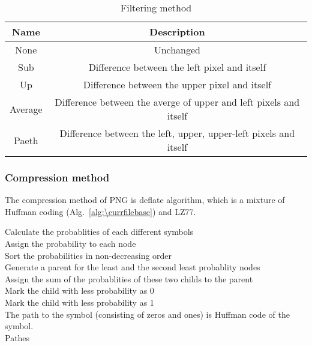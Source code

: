 \documentclass[catalog.tex]{subfiles}
\begin{document}
	\begin{table}[!htb]
		\caption{Filtering method}
		\label{tbl:\currfilebase_4}
		\centering
		\begin{tabular}{cc}
			\toprule
			Name & Description \\
			\midrule
			None & Unchanged \\
			\midrule
			Sub & Difference between the left pixel and itself \\
			\midrule
			Up & Difference between the upper pixel and itself \\
			\midrule
			Average & Difference between the averge of upper and left pixels and itself \\
			\midrule
			Paeth & Difference between the left, upper, upper-left pixels and itself\\
			\bottomrule
		\end{tabular}
	\end{table}

	\newpage
	\subsubsection*{Compression method}
	The compression method of PNG is deflate algorithm, which is a mixture of Huffman coding (Alg.~\ref{alg:\currfilebase}) and LZ77.
	\begin{Algorithm}[Huffman coding \label{alg:\currfilebase}]
		\BlankLine
		Calculate the probablities of each different symbols\\
		Assign the probability to each node\\
		Sort the probabilities in non-decreasing order\\
		{
			Generate a parent for the least and the second least probablity nodes\\
			Assign the sum of the probablities of these two childs to the parent\\
			Mark the child with less probability as 0\\
			Mark the child with less probability as 1\\
		}
		The path to the symbol (consisting of zeros and ones) is Huffman code of the symbol.\\
		\Ret Pathes

	\end{Algorithm}


\singlespacing
\printbibliography[title={References.},resetnumbers=true,heading=subbibliography]
\end{document}
